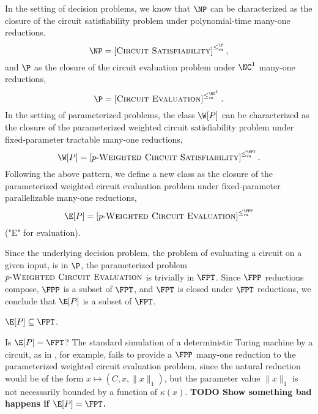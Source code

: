 \documentclass{article}
\newcommand{\todo}[1]{\textbf{TODO #1}}
\newcommand{\dash}{\textnormal{-}}
\newcommand{\pwce}{p\dash\textsc{Weighted Circuit Evaluation}}
\newcommand{\cl}[1]{\left[{#1}\right]}
\begin{document}

In the setting of decision problems, we know that $\NP$ can be characterized as the closure of the circuit satisfiability problem under polynomial-time many-one reductions,
\[
\NP = \cl{\textsc{Circuit Satisfiability}}^{\leq_m^\P},
\]
and $\P$ as the closure of the circuit evaluation problem under $\NC^1$ many-one reductions,
\[
\P = \cl{\textsc{Circuit Evaluation}}^{\leq_m^{\NC^1}}.
\]
In the setting of parameterized problems, the class $\W[P]$ can be characterized as the closure of the parameterized weighted circuit satisfiability problem under fixed-parameter tractable many-one reductions,
\[
\W[P] = \cl{p\dash\textsc{Weighted Circuit Satisfiability}}^{\leq_m^{\FPT}}.
\]
Following the above pattern, we define a new class as the closure of the parameterized weighted circuit evaluation problem under fixed-parameter parallelizable many-one reductions,
\[
\E[P] = \cl{\pwce}^{\leq_m^{\FPP}}
\]
("E" for evaluation).

Since the underlying decision problem, the problem of evaluating a circuit on a given input, is in $\P$, the parameterized problem $\pwce$ is trivially in $\FPT$.
Since $\FPP$ reductions compose, $\FPP$ is a subset of $\FPT$, and $\FPT$ is closed under $\FPT$ reductions, we conclude that $\E[P]$ is a subset of $\FPT$.

\begin{theorem}
  $\E[P] \subseteq \FPT$.
\end{theorem}

Is $\E[P] = \FPT$?
The standard simulation of a deterministic Turing machine by a circuit, as in \autocite{ladner75}, for example, fails to provide a $\FPP$ many-one reduction to the parameterized weighted circuit evaluation problem, since the natural reduction would be of the form $x \mapsto (C, x, \|x\|_1)$, but the parameter value $\|x\|_1$ is not necessarily bounded by a function of $\kappa(x)$.
\todo{Show something bad happens if $\E[P] = \FPT$.}
\end{document}
